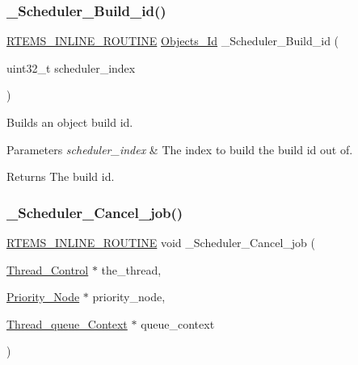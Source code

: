 \subsubsection{\texorpdfstring{\_Scheduler\_Build\_id()}{\_Scheduler\_Build\_id()}}
{\footnotesize\ttfamily \mbox{\hyperlink{group__RTEMSScoreBaseDefs_gac216239df231d5dbd15e3520b0b9313f}{R\+T\+E\+M\+S\+\_\+\+I\+N\+L\+I\+N\+E\+\_\+\+R\+O\+U\+T\+I\+NE}} \mbox{\hyperlink{group__RTEMSScoreObject_ga5821f52a51072941bdd603e542d0863e}{Objects\+\_\+\+Id}} \+\_\+\+Scheduler\+\_\+\+Build\+\_\+id (\begin{DoxyParamCaption}\item[{uint32\+\_\+t}]{scheduler\+\_\+index }\end{DoxyParamCaption})}



Builds an object build id. 


\begin{DoxyParams}{Parameters}
{\em scheduler\+\_\+index} & The index to build the build id out of.\\
\hline
\end{DoxyParams}
\begin{DoxyReturn}{Returns}
The build id. 
\end{DoxyReturn}
\mbox{\label{group__RTEMSScoreScheduler_gaa4fcdf5fd641701ca171698b0ce20032}} 
\subsubsection{\texorpdfstring{\_Scheduler\_Cancel\_job()}{\_Scheduler\_Cancel\_job()}}
{\footnotesize\ttfamily \mbox{\hyperlink{group__RTEMSScoreBaseDefs_gac216239df231d5dbd15e3520b0b9313f}{R\+T\+E\+M\+S\+\_\+\+I\+N\+L\+I\+N\+E\+\_\+\+R\+O\+U\+T\+I\+NE}} void \+\_\+\+Scheduler\+\_\+\+Cancel\+\_\+job (\begin{DoxyParamCaption}\item[{\mbox{\hyperlink{struct__Thread__Control}{Thread\+\_\+\+Control}} $\ast$}]{the\+\_\+thread,  }\item[{\mbox{\hyperlink{structPriority__Node}{Priority\+\_\+\+Node}} $\ast$}]{priority\+\_\+node,  }\item[{\mbox{\hyperlink{structThread__queue__Context}{Thread\+\_\+queue\+\_\+\+Context}} $\ast$}]{queue\+\_\+context }\end{DoxyParamCaption})}



